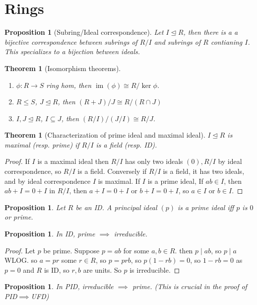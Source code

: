 \documentclass{article}
\theoremstyle{definition}
\theoremstyle{remark}
\theoremstyle{plain}
\newtheorem{thm}[defn]{Theorem}
\newtheorem{prop}[defn]{Proposition}
\theoremstyle{definition}
\begin{document}
\section{Rings}
\begin{prop}[Subring/Ideal correspondence]
    Let $I\trianglelefteq R$, then there is a a bijective correspondence between subrings of $R/I$ and subrings of $R$ contianing $I$. This specializes to a bijection between ideals.
\end{prop}
\begin{thm}[Isomorphism theorems]
    \begin{enumerate}
        \item $\phi: R\to S$ ring hom, then $\operatorname{im}(\phi)\cong R/\ker\phi$.
        \item $R\le S$, $J\trianglelefteq R$, then $(R+J)/J\cong R/(R\cap J)$
        \item $I,J\trianglelefteq R$, $I\subseteq J$, then $(R/I)/(J/I)\cong R/J$.
    \end{enumerate}
\end{thm}
\begin{thm}[Characterization of prime ideal and maximal ideal]
    $I\trianglelefteq R$ is maximal (resp. prime) if $R/I$ is a field (resp. ID).
\end{thm}
\begin{proof}
    If $I$ is a maximal ideal then $R/I$ has only two ideals $(0), R/I$ by ideal correspondence, so $R/I$ is a field. Conversely if $R/I$ is a field, it has two ideals, and by ideal correspondence $I$ is maximal. If $I$ is a prime ideal, If $ab\in I$, then $ab+I=0+I$ in $R/I$, then $a+I=0+I$ or $b+I=0+I$, so $a\in I$ or $b\in I$.
\end{proof}
\begin{prop}
    Let $R$ be an ID. A principal ideal $(p)$ is a prime ideal iff $p$ is $0$ or prime.
\end{prop}
\begin{prop}
    In ID, prime $\implies$ irreducible.
\end{prop}
\begin{proof}
    Let $p$ be prime. Suppose $p=ab$ for some $a,b\in R$. then $p\mid ab$, so $p\mid a$ WLOG. so $a=pr$ some $r\in R$, so $p=prb$, so $p(1-rb)=0$, so $1-rb=0$ as $p=0$ and $R$ is ID, so $r, b$ are units. So $p$ is irreducible.
\end{proof}
\begin{prop}
    In PID, irreducible $\implies$ prime. (This is crucial in the proof of PID$\implies$UFD)
\end{prop}
\end{document}
